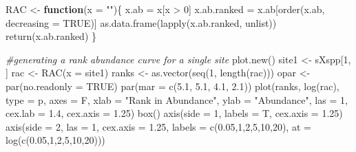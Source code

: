 \documentclass[
]{article}
\newenvironment{Shaded}{\begin{snugshade}}{\end{snugshade}}
\newcommand{\AttributeTok}[1]{\textcolor[rgb]{0.77,0.63,0.00}{#1}}
\newcommand{\CommentTok}[1]{\textcolor[rgb]{0.56,0.35,0.01}{\textit{#1}}}
\newcommand{\ConstantTok}[1]{\textcolor[rgb]{0.00,0.00,0.00}{#1}}
\newcommand{\ControlFlowTok}[1]{\textcolor[rgb]{0.13,0.29,0.53}{\textbf{#1}}}
\newcommand{\DecValTok}[1]{\textcolor[rgb]{0.00,0.00,0.81}{#1}}
\newcommand{\FloatTok}[1]{\textcolor[rgb]{0.00,0.00,0.81}{#1}}
\newcommand{\FunctionTok}[1]{\textcolor[rgb]{0.00,0.00,0.00}{#1}}
\newcommand{\NormalTok}[1]{#1}
\newcommand{\OtherTok}[1]{\textcolor[rgb]{0.56,0.35,0.01}{#1}}
\newcommand{\SpecialCharTok}[1]{\textcolor[rgb]{0.00,0.00,0.00}{#1}}
\newcommand{\StringTok}[1]{\textcolor[rgb]{0.31,0.60,0.02}{#1}}
\begin{document}
\begin{Shaded}
\begin{Highlighting}[]
\NormalTok{RAC }\OtherTok{\textless{}{-}} \ControlFlowTok{function}\NormalTok{(}\AttributeTok{x =} \StringTok{""}\NormalTok{)\{}
\NormalTok{  x.ab }\OtherTok{=}\NormalTok{ x[x }\SpecialCharTok{\textgreater{}} \DecValTok{0}\NormalTok{]}
\NormalTok{  x.ab.ranked }\OtherTok{=}\NormalTok{ x.ab[}\FunctionTok{order}\NormalTok{(x.ab, }\AttributeTok{decreasing =} \ConstantTok{TRUE}\NormalTok{)]}
  \FunctionTok{as.data.frame}\NormalTok{(}\FunctionTok{lapply}\NormalTok{(x.ab.ranked, unlist))}
  \FunctionTok{return}\NormalTok{(x.ab.ranked)}
\NormalTok{\}}

\CommentTok{\#generating a rank abundance curve for a single site}
\FunctionTok{plot.new}\NormalTok{()}
\NormalTok{site1 }\OtherTok{\textless{}{-}}\NormalTok{ sXspp[}\DecValTok{1}\NormalTok{, ] }
\NormalTok{rac }\OtherTok{\textless{}{-}} \FunctionTok{RAC}\NormalTok{(}\AttributeTok{x =}\NormalTok{ site1)}
\NormalTok{ranks }\OtherTok{\textless{}{-}} \FunctionTok{as.vector}\NormalTok{(}\FunctionTok{seq}\NormalTok{(}\DecValTok{1}\NormalTok{, }\FunctionTok{length}\NormalTok{(rac)))}
\NormalTok{opar }\OtherTok{\textless{}{-}} \FunctionTok{par}\NormalTok{(}\AttributeTok{no.readonly =} \ConstantTok{TRUE}\NormalTok{)}
\FunctionTok{par}\NormalTok{(}\AttributeTok{mar =} \FunctionTok{c}\NormalTok{(}\FloatTok{5.1}\NormalTok{, }\FloatTok{5.1}\NormalTok{, }\FloatTok{4.1}\NormalTok{, }\FloatTok{2.1}\NormalTok{))}
\FunctionTok{plot}\NormalTok{(ranks, }\FunctionTok{log}\NormalTok{(rac), }\AttributeTok{type =} \StringTok{\textquotesingle{}p\textquotesingle{}}\NormalTok{, }\AttributeTok{axes =}\NormalTok{ F,}
     \AttributeTok{xlab =} \StringTok{"Rank in Abundance"}\NormalTok{, }\AttributeTok{ylab =} \StringTok{"Abundance"}\NormalTok{,}
     \AttributeTok{las =} \DecValTok{1}\NormalTok{, }\AttributeTok{cex.lab =} \FloatTok{1.4}\NormalTok{, }\AttributeTok{cex.axis =} \FloatTok{1.25}\NormalTok{)}
\FunctionTok{box}\NormalTok{()}
\FunctionTok{axis}\NormalTok{(}\AttributeTok{side =} \DecValTok{1}\NormalTok{, }\AttributeTok{labels =}\NormalTok{ T, }\AttributeTok{cex.axis =} \FloatTok{1.25}\NormalTok{)}
\FunctionTok{axis}\NormalTok{(}\AttributeTok{side =} \DecValTok{2}\NormalTok{, }\AttributeTok{las =} \DecValTok{1}\NormalTok{, }\AttributeTok{cex.axis =} \FloatTok{1.25}\NormalTok{,}
     \AttributeTok{labels =} \FunctionTok{c}\NormalTok{(}\FloatTok{0.05}\NormalTok{,}\DecValTok{1}\NormalTok{,}\DecValTok{2}\NormalTok{,}\DecValTok{5}\NormalTok{,}\DecValTok{10}\NormalTok{,}\DecValTok{20}\NormalTok{), }\AttributeTok{at =} \FunctionTok{log}\NormalTok{(}\FunctionTok{c}\NormalTok{(}\FloatTok{0.05}\NormalTok{,}\DecValTok{1}\NormalTok{,}\DecValTok{2}\NormalTok{,}\DecValTok{5}\NormalTok{,}\DecValTok{10}\NormalTok{,}\DecValTok{20}\NormalTok{)))}
\end{Highlighting}
\end{Shaded}
\end{document}
